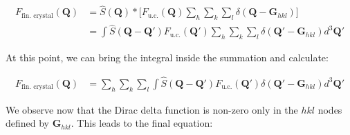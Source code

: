 
\begin{equation}
    \begin{aligned}
    F_{\text{fin. crystal}}(\mathbf{Q}) &= 
    \widehat S(\mathbf{Q}) \ast  \Big[ F_{\text{u.c.}}(\mathbf{Q}) \sum_{h} \sum_{k} \sum_{l} \delta\!\left(\mathbf Q - \mathbf{G}_{hkl}\right) \Big] \\
    &= \int \widehat S(\mathbf{Q} -\mathbf{Q'}) F_{\text{u.c.}}(\mathbf{Q'}) \sum_{h} \sum_{k} \sum_{l} \delta\!\left(\mathbf Q' - \mathbf{G}_{hkl}\right) d^3\mathbf{Q'} 
    \end{aligned} 
    \label{eq:fin_cryst2}
\end{equation}

At this point, we can bring the integral inside the summation and calculate: 

\begin{equation}
    \begin{aligned}
    F_{\text{fin. crystal}}(\mathbf{Q}) &= 
    \sum_{h} \sum_{k} \sum_{l} \int \widehat S(\mathbf{Q} -\mathbf{Q'}) F_{\text{u.c.}}(\mathbf{Q'}) \delta\!\left(\mathbf Q' - \mathbf{G}_{hkl}\right) d^3\mathbf{Q'} 
    \end{aligned} 
    \label{eq:fin_cryst3}
\end{equation}

We observe now that the Dirac delta function is non-zero only in the $hkl$ nodes defined by $\mathbf{G}_{hkl}$. 
This leads to the final equation: 

